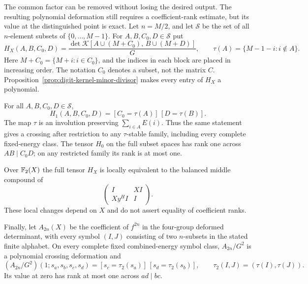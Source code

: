 The common factor can be removed without losing the desired output.
The resulting polynomial deformation still requires a coefficient-rank
estimate, but its value at the distinguished point is exact.
Let $n=M/2$, and let $\mathcal S$ be the set of all $n$-element
subsets of $\{0,\ldots,M-1\}$. For $A,B,C_0,D\in\mathcal S$ put
\[
 H_X(A,B,C_0,D)=
 \frac{\det\mathcal K[A\cup(M+C_0),\,B\cup(M+D)]}{G},
 \qquad
 \tau(A)=\{M-1-i:i\notin A\}.
\]
Here $M+C_0=\{M+i:i\in C_0\}$, and the indices in each block
are placed in increasing order. The notation $C_0$ denotes a subset,
not the matrix $C$. Proposition~\ref{prop:digit-kernel-minor-divisor}
makes every entry of $H_X$ a polynomial.

\begin{proposition}
\label{prop:normalized-minor-crossing}
For all $A,B,C_0,D\in\mathcal S$,
\begin{equation}\label{eq:normalized-minor-output}
 H_1(A,B,C_0,D)=[C_0=\tau(A)]\,[D=\tau(B)].
\end{equation}
The map $\tau$ is an involution preserving $\sum_{i\in A}E(i)$.
Thus the same statement gives a crossing after restriction to any
$\tau$-stable family, including every complete fixed-energy class.
The tensor $H_0$ on the full subset spaces has rank one across
$AB\mid C_0D$; on any restricted family its rank is at most one.

Over $\mathbb F_2(X)$ the full tensor $H_X$ is locally equivalent to
the balanced middle compound of
\begin{equation}\label{eq:scalar-balanced-kernel}
 \begin{pmatrix}I&XI\\Xy^H I&I\end{pmatrix}.
\end{equation}
These local changes depend on $X$ and do not assert equality of
coefficient ranks.

Finally, let $A_{2n}(X)$ be the coefficient of $f^{2n}$ in the
four-group deformed determinant, with every symbol $(I,J)$ consisting
of two $n$-subsets in the stated finite alphabet. On every complete
fixed combined-energy symbol class, $A_{2n}/G^2$ is a polynomial
crossing deformation and
\begin{equation}\label{eq:normalized-top-output}
 (A_{2n}/G^2)(1;s_a,s_b,s_c,s_d)
   =[s_c=\tau_2(s_a)]\,[s_d=\tau_2(s_b)],
 \qquad \tau_2(I,J)=(\tau(I),\tau(J)).
\end{equation}
Its value at zero has rank at most one across $ad\mid bc$.
\end{proposition}


